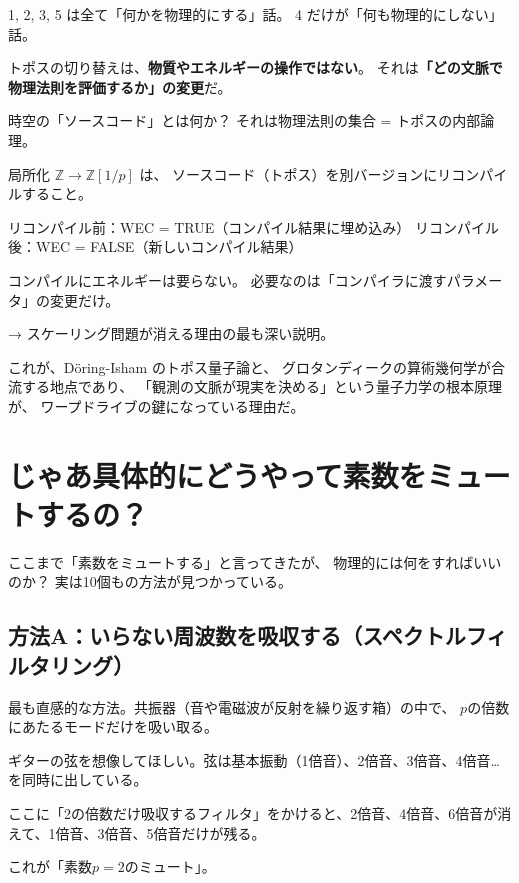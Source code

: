 \documentclass[12pt,a4paper]{article}
\begin{document}
1, 2, 3, 5 は全て「何かを物理的にする」話。
4 だけが「何も物理的にしない」話。

トポスの切り替えは、\textbf{物質やエネルギーの操作ではない}。
それは\textbf{「どの文脈で物理法則を評価するか」の変更}だ。

\begin{keybox}
時空の「ソースコード」とは何か？
それは物理法則の集合 = トポスの内部論理。

局所化 $\mathbb{Z} \to \mathbb{Z}[1/p]$ は、
ソースコード（トポス）を別バージョンにリコンパイルすること。

リコンパイル前：WEC = TRUE（コンパイル結果に埋め込み）
リコンパイル後：WEC = FALSE（新しいコンパイル結果）

コンパイルにエネルギーは要らない。
必要なのは「コンパイラに渡すパラメータ」の変更だけ。

→ スケーリング問題が消える理由の最も深い説明。
\end{keybox}

これが、Döring-Isham のトポス量子論と、
グロタンディークの算術幾何学が合流する地点であり、
「観測の文脈が現実を決める」という量子力学の根本原理が、
ワープドライブの鍵になっている理由だ。

\section{じゃあ具体的にどうやって素数をミュートするの？}

ここまで「素数をミュートする」と言ってきたが、
物理的には何をすればいいのか？
実は10個もの方法が見つかっている。

\subsection{方法A：いらない周波数を吸収する（スペクトルフィルタリング）}

最も直感的な方法。共振器（音や電磁波が反射を繰り返す箱）の中で、
$p$の倍数にあたるモードだけを吸い取る。

\begin{analogybox}
ギターの弦を想像してほしい。弦は基本振動（1倍音）、2倍音、3倍音、4倍音…を同時に出している。

ここに「2の倍数だけ吸収するフィルタ」をかけると、2倍音、4倍音、6倍音が消えて、1倍音、3倍音、5倍音だけが残る。

これが「素数$p=2$のミュート」。
\end{analogybox}
\end{document}

